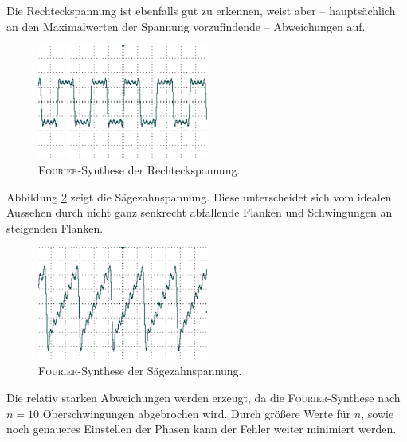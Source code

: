 Die Rechteckspannung ist ebenfalls gut zu erkennen, weist aber -- hauptsächlich an den Maximalwerten der Spannung vorzufindende -- Abweichungen auf. 
\begin{figure}
	\centering
		\includegraphics[width=0.5\textwidth]{Bilder/1-9_RE.pdf}		
\caption{\textsc{Fourier}-Synthese der Rechteckspannung. \cite{gimp}}
	\label{fig:1-9_RE}
\end{figure}
Abbildung \ref{fig:1-9_SZ} zeigt die Sägezahnspannung. Diese unterscheidet sich vom idealen Aussehen durch nicht ganz senkrecht abfallende Flanken und Schwingungen an steigenden Flanken.
\begin{figure}
	\centering
		\includegraphics[width=0.5\textwidth]{Bilder/1-9_SZ.pdf}		
\caption{\textsc{Fourier}-Synthese der Sägezahnspannung. \cite{gimp}}
	\label{fig:1-9_SZ}
\end{figure}

Die relativ starken Abweichungen werden erzeugt, da die \textsc{Fourier}-Synthese nach $n=10$ Oberschwingungen abgebrochen wird. Durch größere Werte für $n$, sowie noch genaueres Einstellen der Phasen kann der Fehler weiter minimiert werden.

